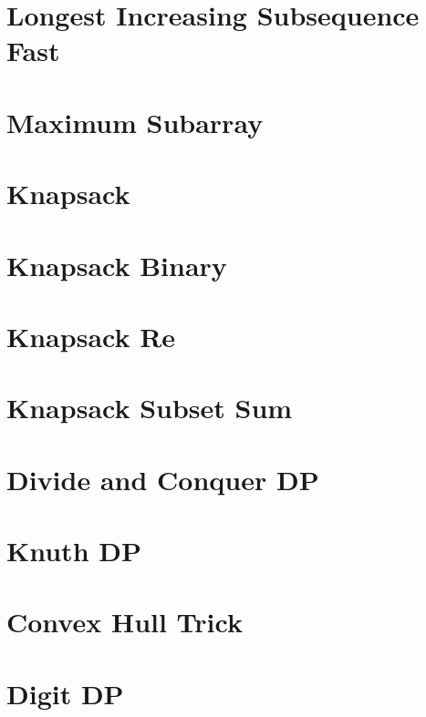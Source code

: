 \documentclass[12pt, a4paper]{report}
\let\oldsection\section
\renewcommand{\section}{\clearpage\oldsection}
\begin{document}
\section{Longest Increasing Subsequence Fast}


\section{Maximum Subarray}


\section{Knapsack}


\section{Knapsack Binary}


\section{Knapsack Re}


\section{Knapsack Subset Sum}


\section{Divide and Conquer DP}


\section{Knuth DP}


\section{Convex Hull Trick}


\section{Digit DP}

\end{document}
